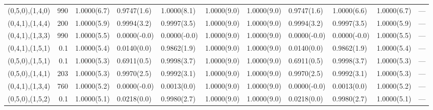 \begin{tabular}{lrlllllllll}
 (0,5,0),(1,4,0) &  990   & 1.0000(6.7) & 0.9747(1.6)  & 1.0000(8.1)  & 1.0000(9.0)    & 1.0000(9.0)  & 0.9747(1.6)    & 1.0000(6.6)  & 1.0000(6.7) & ---    \\
 (0,4,1),(1,4,4) &  200   & 1.0000(5.9) & 0.9994(3.2)  & 0.9997(3.5)  & 1.0000(9.0)    & 1.0000(9.0)  & 0.9994(3.2)    & 0.9997(3.5)  & 1.0000(5.9) & ---    \\
 (0,4,1),(1,3,3) &  990   & 1.0000(5.5) & 0.0000(-0.0) & 0.0000(-0.0) & 1.0000(9.0)    & 1.0000(9.0)  & 0.0000(-0.0)   & 0.0000(-0.0) & 1.0000(5.5) & ---    \\
 (0,4,1),(1,5,1) &    0.1 & 1.0000(5.4) & 0.0140(0.0)  & 0.9862(1.9)  & 1.0000(9.0)    & 1.0000(9.0)  & 0.0140(0.0)    & 0.9862(1.9)  & 1.0000(5.4) & ---    \\
 (0,5,0),(1,5,1) &    0.1 & 1.0000(5.3) & 0.6911(0.5)  & 0.9998(3.7)  & 1.0000(9.0)    & 1.0000(9.0)  & 0.6911(0.5)    & 0.9998(3.7)  & 1.0000(5.3) & ---    \\
 (0,5,0),(1,4,1) &  203   & 1.0000(5.3) & 0.9970(2.5)  & 0.9992(3.1)  & 1.0000(9.0)    & 1.0000(9.0)  & 0.9970(2.5)    & 0.9992(3.1)  & 1.0000(5.3) & ---    \\
 (0,4,1),(1,3,4) &  760   & 1.0000(5.2) & 0.0000(-0.0) & 0.0013(0.0)  & 1.0000(9.0)    & 1.0000(9.0)  & 0.0000(-0.0)   & 0.0013(0.0)  & 1.0000(5.2) & ---    \\
 (0,5,0),(1,5,2) &    0.1 & 1.0000(5.1) & 0.0218(0.0)  & 0.9980(2.7)  & 1.0000(9.0)    & 1.0000(9.0)  & 0.0218(0.0)    & 0.9980(2.7)  & 1.0000(5.1) & ---    \\
\hline
\end{tabular}